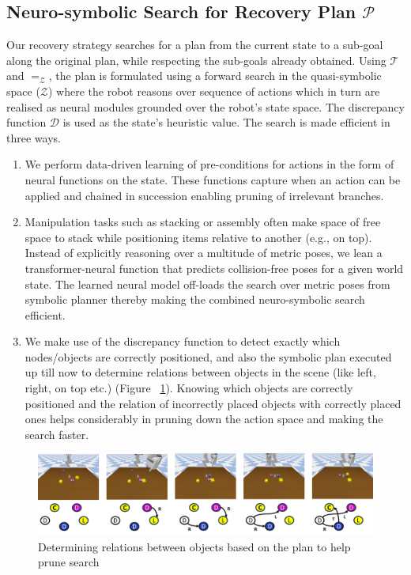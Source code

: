 \subsection{Neuro-symbolic Search for Recovery Plan $\mathcal{P}$}
\label{subsec:plan}
Our recovery strategy searches for a plan from the current state to a sub-goal along the original plan, while respecting the sub-goals already obtained. Using $\mathcal{T}$ and $=_\mathcal{Z}$, the plan is formulated using a forward search in the quasi-symbolic space ($\mathcal{Z}$) where the robot reasons over sequence of actions which in turn are realised as neural modules grounded over the robot’s state space. The discrepancy function $\mathcal{D}$ is used as the state's heuristic value. The search is made efficient in three ways. 
\begin{enumerate}
    \item We perform data-driven learning of pre-conditions for actions in the form of neural functions on the state. These functions capture when an action can be applied and chained in succession enabling pruning of irrelevant branches.
    \item Manipulation tasks such as stacking or assembly often make space of free space to stack while positioning items relative to another (e.g., on top). Instead of explicitly reasoning over a multitude of metric poses, we lean a transformer-neural function that predicts collision-free poses for a given world state. The learned neural model off-loads the search over metric poses from symbolic planner thereby making the combined neuro-symbolic search efficient.
    \item We make use of the discrepancy function to detect exactly which nodes/objects are correctly positioned, and also the symbolic plan executed up till now to determine relations between objects in the scene (like left, right, on top etc.) (Figure ~\ref{fig:pruning}). Knowing which objects are correctly positioned and the relation of incorrectly placed objects with correctly placed ones helps considerably in pruning down the action space and making the search faster.
\end{enumerate}  

\begin{figure}
    \centering
    \includegraphics[width=\textwidth]{assets/pruning.png}
    \caption{Determining relations between objects based on the plan to help prune search}
    \label{fig:pruning}
\end{figure}

